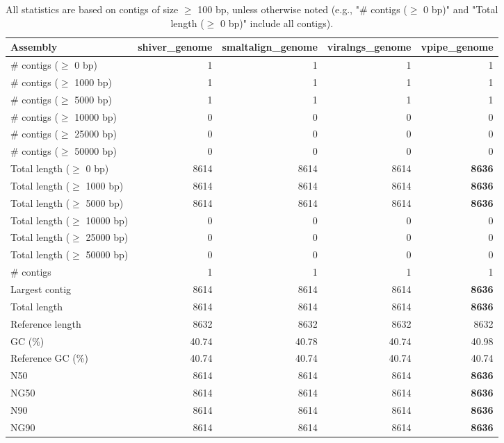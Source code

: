 \documentclass[12pt,a4paper]{article}
\begin{document}
\begin{table}[ht]
\begin{center}
\caption{All statistics are based on contigs of size $\geq$ 100 bp, unless otherwise noted (e.g., "\# contigs ($\geq$ 0 bp)" and "Total length ($\geq$ 0 bp)" include all contigs).}
\begin{tabular}{|l*{4}{|r}|}
\hline
Assembly & shiver\_genome & smaltalign\_genome & viralngs\_genome & vpipe\_genome \\ \hline
\# contigs ($\geq$ 0 bp) & 1 & 1 & 1 & 1 \\ \hline
\# contigs ($\geq$ 1000 bp) & 1 & 1 & 1 & 1 \\ \hline
\# contigs ($\geq$ 5000 bp) & 1 & 1 & 1 & 1 \\ \hline
\# contigs ($\geq$ 10000 bp) & 0 & 0 & 0 & 0 \\ \hline
\# contigs ($\geq$ 25000 bp) & 0 & 0 & 0 & 0 \\ \hline
\# contigs ($\geq$ 50000 bp) & 0 & 0 & 0 & 0 \\ \hline
Total length ($\geq$ 0 bp) & 8614 & 8614 & 8614 & {\bf 8636} \\ \hline
Total length ($\geq$ 1000 bp) & 8614 & 8614 & 8614 & {\bf 8636} \\ \hline
Total length ($\geq$ 5000 bp) & 8614 & 8614 & 8614 & {\bf 8636} \\ \hline
Total length ($\geq$ 10000 bp) & 0 & 0 & 0 & 0 \\ \hline
Total length ($\geq$ 25000 bp) & 0 & 0 & 0 & 0 \\ \hline
Total length ($\geq$ 50000 bp) & 0 & 0 & 0 & 0 \\ \hline
\# contigs & 1 & 1 & 1 & 1 \\ \hline
Largest contig & 8614 & 8614 & 8614 & {\bf 8636} \\ \hline
Total length & 8614 & 8614 & 8614 & {\bf 8636} \\ \hline
Reference length & 8632 & 8632 & 8632 & 8632 \\ \hline
GC (\%) & 40.74 & 40.78 & 40.74 & 40.98 \\ \hline
Reference GC (\%) & 40.74 & 40.74 & 40.74 & 40.74 \\ \hline
N50 & 8614 & 8614 & 8614 & {\bf 8636} \\ \hline
NG50 & 8614 & 8614 & 8614 & {\bf 8636} \\ \hline
N90 & 8614 & 8614 & 8614 & {\bf 8636} \\ \hline
NG90 & 8614 & 8614 & 8614 & {\bf 8636} \\ \hline

\end{tabular}
\end{center}
\end{table}
\end{document}
